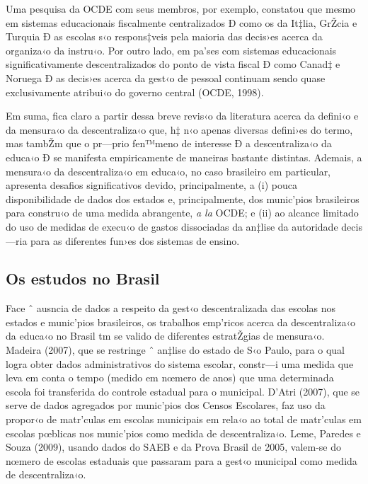 \documentclass[a4paper, 12pt]{article}
\begin{document}
Uma pesquisa da OCDE com seus membros, por exemplo, constatou que mesmo em sistemas educacionais fiscalmente centralizados Ð como os da It‡lia, GrŽcia e Turquia Ð as escolas s‹o respons‡veis pela maioria das decis›es acerca da organiza‹o da instru‹o. Por outro lado, em pa’ses com sistemas educacionais significativamente descentralizados do ponto de vista fiscal Ð como Canad‡ e Noruega Ð as decis›es acerca da gest‹o de pessoal continuam sendo quase exclusivamente atribui‹o do governo central (OCDE, 1998).

Em suma, fica claro a partir dessa breve revis‹o da literatura acerca da defini‹o e da mensura‹o da descentraliza‹o que, h‡ n‹o apenas diversas defini›es do termo, mas tambŽm que o pr—prio fen™meno de interesse Ð a descentraliza‹o da educa‹o Ð se manifesta empiricamente de maneiras bastante distintas. Ademais, a mensura‹o da descentraliza‹o em educa‹o, no caso brasileiro em particular, apresenta desafios significativos devido, principalmente, a (i) pouca disponibilidade de dados dos estados e, principalmente, dos munic’pios brasileiros para constru‹o de uma medida abrangente, \emph{a la} OCDE; e (ii) ao alcance limitado do uso de medidas de execu‹o de gastos dissociadas da an‡lise da autoridade decis—ria para as diferentes fun›es dos sistemas de ensino.

\subsection{Os estudos no Brasil}

Face ˆ ausncia de dados a respeito da gest‹o descentralizada das escolas nos estados e munic’pios brasileiros, os trabalhos emp’ricos acerca da descentraliza‹o da educa‹o no Brasil tm se valido de diferentes estratŽgias de mensura‹o. Madeira (2007), que se restringe ˆ an‡lise do estado de S‹o Paulo, para o qual logra obter dados administrativos do sistema escolar, constr—i uma medida que leva em conta o tempo (medido em nœmero de anos) que uma determinada escola foi transferida do controle estadual para o municipal. D'Atri (2007), que se serve de dados agregados por munic’pios dos Censos Escolares, faz uso da propor‹o de matr’culas em escolas municipais em rela‹o ao total de matr’culas em escolas pœblicas nos munic’pios como medida de descentraliza‹o. Leme, Paredes e Souza (2009), usando dados do SAEB e da Prova Brasil de 2005, valem-se do nœmero de escolas estaduais que passaram para a gest‹o municipal como medida de descentraliza‹o.
\end{document}
